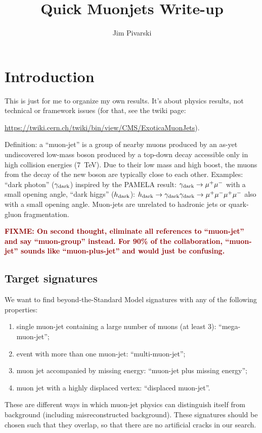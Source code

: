 \documentclass[12pt]{article}
\title{\huge \bf Quick Muonjets Write-up}
\author{Jim Pivarski}
\newcommand{\fixme}[1]{\textcolor{darkred}{\bf FIXME: #1}}
\newcommand{\s}[1]{{\mbox{\scriptsize #1}}}
\begin{document}
\maketitle

\tableofcontents

\section{Introduction}
This is just for me to organize my own results.  It's about physics
results, not technical or framework issues (for that, see the twiki
page:

\href{https://twiki.cern.ch/twiki/bin/view/CMS/ExoticaMuonJets}{https://twiki.cern.ch/twiki/bin/view/CMS/ExoticaMuonJets}).

Definition: a ``muon-jet'' is a group of nearby muons produced by an
as-yet undiscovered low-mass boson produced by a top-down decay
accessible only in high collision energies (7~TeV).  Due to their low
mass and high boost, the muons from the decay of the new boson are
typically close to each other.  Examples: ``dark photon''
($\gamma_\s{dark}$) inspired by the PAMELA result:
$\gamma_\s{dark} \to \mu^+\mu^-$ with a small opening
angle, ``dark higgs'' ($h_\s{dark}$):
$h_\s{dark} \to \gamma_\s{dark}\gamma_\s{dark} \to \mu^+\mu^-\mu^+\mu^-$
also with a small opening angle.  Muon-jets are unrelated to hadronic
jets or quark-gluon fragmentation.

\fixme{On second thought, eliminate all references to ``muon-jet'' and
  say ``muon-group'' instead.  For 90\% of the collaboration,
  ``muon-jet'' sounds like ``muon-plus-jet'' and would just be
  confusing.}

\subsection{Target signatures}

We want to find beyond-the-Standard Model signatures with any of the
following properties:
\begin{enumerate}
\item single muon-jet containing a large number of muons (at least 3): ``mega-muon-jet'';
\item event with more than one muon-jet: ``multi-muon-jet'';
\item muon jet accompanied by missing energy: ``muon-jet plus missing energy'';
\item muon jet with a highly displaced vertex: ``displaced muon-jet''.
\end{enumerate}
These are different ways in which muon-jet physics can distinguish
itself from background (including misreconstructed background).  These
signatures should be chosen such that they overlap, so that there are
no artificial cracks in our search.
\end{document}
